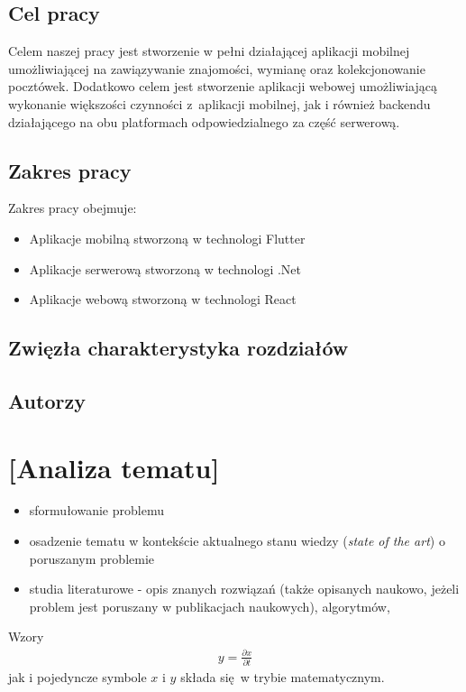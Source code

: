 \documentclass[a4paper,twoside,12pt]{book}
\newcommand{\obcy}[1]{\emph{#1}}
\newcommand{\english}[1]{{\selectlanguage{british}\obcy{#1}}}
\begin{document}
\section{Cel pracy}
Celem naszej pracy jest stworzenie w pełni działającej aplikacji mobilnej umożliwiającej na zawiązywanie znajomości, wymianę oraz kolekcjonowanie pocztówek. Dodatkowo celem jest stworzenie aplikacji webowej umożliwiającą wykonanie większości czynności z~aplikacji mobilnej, jak i również backendu działającego na obu platformach odpowiedzialnego za część serwerową.

\section{Zakres pracy}
Zakres pracy obejmuje:
\begin{itemize}
    \item Aplikacje mobilną stworzoną w technologi Flutter
    \item Aplikacje serwerową stworzoną w technologi .Net
    \item Aplikacje webową stworzoną w technologi React
\end{itemize}

\section{Zwięzła charakterystyka rozdziałów}

\section{Autorzy}


\chapter{[Analiza tematu]}

\begin{itemize}
\item sformułowanie problemu
\item osadzenie tematu w kontekście aktualnego stanu wiedzy (\english{state of the art}) o poruszanym problemie
\item  studia literaturowe \cite{bib:artykul,bib:ksiazka,bib:konferencja,bib:internet} -  opis znanych rozwiązań (także opisanych naukowo, jeżeli problem jest poruszany w publikacjach naukowych), algorytmów, 
\end{itemize}


Wzory  
\begin{align}
y = \frac{\partial x}{\partial t}
\end{align}
jak i pojedyncze symbole $x$ i $y$  składa się w trybie matematycznym.
\end{document}

